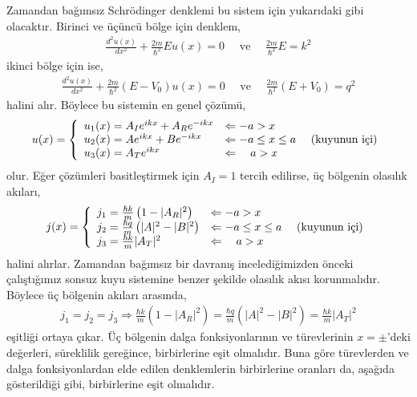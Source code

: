 \documentclass[a4paper,12pt, twoside]{article}
\begin{document}
Zamandan bağımsız Schrödinger denklemi bu sistem için yukarıdaki gibi olacaktır. Birinci ve üçüncü bölge için denklem,
\begin{align}
\frac { d ^ { 2 } u ( x ) } { d x ^ { 2 } } +  \frac { 2 m} { \hbar ^ { 2 } } E u ( x ) = 0 \quad \text{ ve } \quad \frac { 2 m} { \hbar ^ { 2 } } E = k ^ { 2 }
\end{align}
ikinci bölge için ise,
\begin{align}
\frac { d ^ { 2 } u ( x ) } { d x ^ { 2 } } +  \frac { 2 m} { \hbar ^ { 2 } }  \left( E - V _ { 0 } \right) u ( x ) = 0 \quad \text{ ve } \quad \frac { 2 m} { \hbar ^ { 2 } }  \left( E + V _ { 0 } \right) = q ^ { 2 }
\end{align}
halini alır. Böylece bu sistemin en genel çözümü,
\begin{align}
u ( x )  = \left\{ 
\begin{array} { l l } 
{u_1(x) = A_I e^{i k x} + A_R e^{-i k x} } & {\Leftarrow -a > x } \\
{u_2(x) = A e^{i k x} + B e^{-i k x} } & {\Leftarrow -a \leq x \leq a } \quad \text{ (kuyunun içi)} \\
{u_3(x) = A_T e^{i k x}} & {\Leftarrow \quad a > x }
\end{array} \right. 
\end{align}
olur. Eğer çözümleri basitleştirmek için $A_I=1$ tercih edilirse, üç bölgenin olasılık akıları,
\begin{align}
j ( x )  = \left\{ 
\begin{array} { l l } 
{j_1 = \frac{\hbar k}{m}\left(1-|A_R|^{2}\right) } & {\Leftarrow -a > x } \\
{j_2 = \frac{\hbar q}{m}\left(|A|^{2}-|B|^{2}\right) } & {\Leftarrow -a \leq x \leq a } \quad \text{ (kuyunun içi)} \\
{j_3 = \frac{\hbar k}{m}|A_T|^{2}} & {\Leftarrow \quad a > x }
\end{array} \right. 
\end{align}
halini alırlar. Zamandan bağımsız bir davranış incelediğimizden önceki çalıştığımız sonsuz kuyu sistemine benzer şekilde olasılık akısı korunmalıdır. Böylece üç bölgenin akıları arasında,
\begin{align}
	j_1 = 	j_2 = 	j_3 \Longrightarrow \frac{\hbar k}{m}\left(1-|A_R|^{2}\right)=\frac{\hbar q}{m}\left(|A|^{2}-|B|^{2}\right)=\frac{\hbar k}{m}|A_T|^{2}
	\label{eq:sonlukuyu_j1j2j3}
\end{align}
eşitliği ortaya çıkar. Üç bölgenin dalga fonksiyonlarının ve türevlerinin $x=\pm$'deki değerleri, süreklilik gereğince, birbirlerine eşit olmalıdır. Buna göre türevlerden ve dalga fonksiyonlardan elde edilen denklemlerin birbirlerine oranları da, aşağıda gösterildiği gibi, birbirlerine eşit olmalıdır. 
\end{document}
